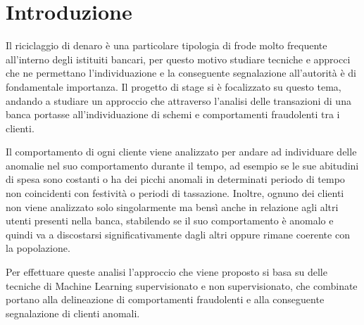 \mainmatter
\chapter{Introduzione}
Il riciclaggio di denaro è una particolare tipologia di frode molto frequente all'interno degli istituiti bancari, per questo motivo studiare tecniche e approcci che ne permettano l'individuazione e la conseguente segnalazione all'autorità è di fondamentale importanza.
Il progetto di stage si è focalizzato su questo tema, andando a studiare un approccio che attraverso l'analisi delle transazioni di una banca portasse all'individuazione di schemi e comportamenti fraudolenti tra i clienti.

Il comportamento di ogni cliente viene analizzato per andare ad individuare delle anomalie nel suo comportamento durante il tempo, ad esempio se le sue abitudini di spesa sono costanti o ha dei picchi anomali in determinati periodo di tempo non coincidenti con festività o periodi di tassazione. 
Inoltre, ognuno dei clienti non viene analizzato solo singolarmente ma bensì anche in relazione agli altri utenti presenti nella banca, stabilendo se il suo comportamento è anomalo e quindi va a discostarsi significativamente dagli altri oppure rimane coerente con la popolazione.

Per effettuare queste analisi l'approccio che viene proposto si basa su delle tecniche di Machine Learning supervisionato e non supervisionato, che combinate portano alla delineazione di comportamenti fraudolenti e alla conseguente segnalazione di clienti anomali. 